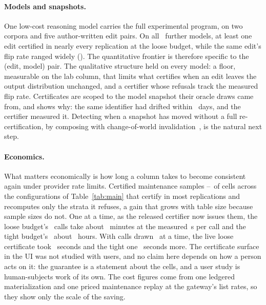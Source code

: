\keeprunin
\paragraph{Models and snapshots.} One low-cost reasoning model carries
the full experimental program, on two corpora and five author-written
edit pairs. On all \famCountWord\
further models, at least one edit certified in nearly every replication
at the loose budget, while the same edit's flip rate ranged widely
(\secref{sec:exp-families}). The quantitative frontier is therefore specific to the (edit, model) pair. The qualitative structure
held on every model: a floor, measurable on the lab column, that
limits what certifies when an edit leaves the output distribution
unchanged, and a certifier whose refusals track the measured flip rate.
Certificates are scoped to the model snapshot their oracle draws came
from, and \secref{sec:exp-deploy} shows why: the same identifier had
drifted within \driftDaysLater\ days, and the certifier measured it.
Detecting when a snapshot has moved without a full re-certification, by
composing \sivm{} with change-of-world
invalidation~\cite{evergreen,freshcache}, is the natural next step.

\keeprunin
\paragraph{Economics.} What matters economically is how long a column
takes to become consistent again under provider rate limits. Certified
maintenance samples \sampleFracLo--\sampleFracHi\ of cells across the
configurations of Table~\ref{tab:main} that certify in most
replications and recomputes only the strata it refuses, a gain that
grows with table size because sample sizes do not. One at a time, as
the released certifier now issues them, the loose budget's
\sepOracleLoose\ calls take about \seqWallLooseMinutes\ minutes at the
measured \seqSecondsPerCall\,s per call and the tight budget's
\sepOracleTight\ about \seqWallTightHours\ hours. With calls drawn \deployConcurrency\ at a time, the
live loose certificate took \sepWallLoose\ seconds and the tight one
\sepWallTight\ seconds more. The certificate surface in the UI was not studied with users,
and no claim here depends on how a person acts on it: the guarantee is a
statement about the cells, and a user study is human-subjects work of
its own. The cost figures come from one ledgered materialization and
one priced maintenance replay at the gateway's list rates, so they show
only the scale of the saving.


